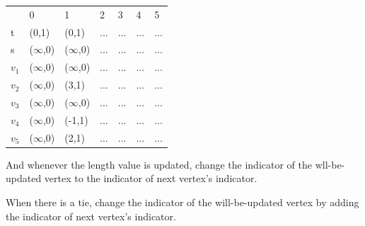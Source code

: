 \documentclass[a4paper,11pt]{article}
\begin{document}
\begin{enumerate}
\begin{center}
\begin{tabular}{lllllll}
                       & 0                         & 1                     & 2                     & 3                     & 4                     & 5                     \\ \cline{2-7} 
\multicolumn{1}{l|}{t} & \multicolumn{1}{l|}{(0,1)} & \multicolumn{1}{l|}{(0,1)} & \multicolumn{1}{l|}{...} & \multicolumn{1}{l|}{...} & \multicolumn{1}{l|}{...} & \multicolumn{1}{l|}{...} \\ \cline{2-7} 
\multicolumn{1}{l|}{s} & \multicolumn{1}{l|}{($\infty$,0)} & \multicolumn{1}{l|}{($\infty$,0)} & \multicolumn{1}{l|}{...} & \multicolumn{1}{l|}{...} & \multicolumn{1}{l|}{...} & \multicolumn{1}{l|}{...} \\ \cline{2-7} 
\multicolumn{1}{l|}{$v_1$} & \multicolumn{1}{l|}{($\infty$,0)} & \multicolumn{1}{l|}{($\infty$,0)} & \multicolumn{1}{l|}{...} & \multicolumn{1}{l|}{...} & \multicolumn{1}{l|}{...} & \multicolumn{1}{l|}{...} \\ \cline{2-7} 
\multicolumn{1}{l|}{$v_2$} & \multicolumn{1}{l|}{($\infty$,0)} & \multicolumn{1}{l|}{(3,1)} & \multicolumn{1}{l|}{...} & \multicolumn{1}{l|}{...} & \multicolumn{1}{l|}{...} & \multicolumn{1}{l|}{...} \\ \cline{2-7} 
\multicolumn{1}{l|}{$v_3$} & \multicolumn{1}{l|}{($\infty$,0)} & \multicolumn{1}{l|}{($\infty$,0)} & \multicolumn{1}{l|}{...} & \multicolumn{1}{l|}{...} & \multicolumn{1}{l|}{...} & \multicolumn{1}{l|}{...} \\ \cline{2-7} 
\multicolumn{1}{l|}{$v_4$} & \multicolumn{1}{l|}{($\infty$,0)} & \multicolumn{1}{l|}{(-1,1)} & \multicolumn{1}{l|}{...} & \multicolumn{1}{l|}{...} & \multicolumn{1}{l|}{...} & \multicolumn{1}{l|}{...} \\ \cline{2-7}  
\multicolumn{1}{l|}{$v_5$} & \multicolumn{1}{l|}{($\infty$,0)} & \multicolumn{1}{l|}{(2,1)} & \multicolumn{1}{l|}{...} & \multicolumn{1}{l|}{...} & \multicolumn{1}{l|}{...} & \multicolumn{1}{l|}{...} \\ \cline{2-7} 
\end{tabular}
\end{center}

And whenever the length value is updated, change the indicator of the wll-be-updated vertex to the indicator of next vertex's indicator.

When there is a tie, change the indicator of the will-be-updated vertex by adding the indicator of next vertex's indicator.


\end{enumerate}
\end{document}
